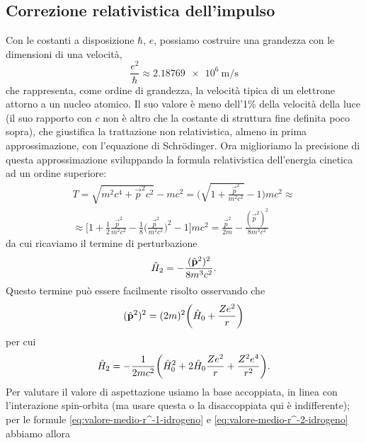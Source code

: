\subsection{Correzione relativistica dell'impulso}
Con le costanti a disposizione $\hbar$, $e$, possiamo costruire una grandezza con le dimensioni di una velocità,
\begin{equation}
    \frac{e^2}{\hbar}\approx\SI{2.18769e6}{\meter\per\second}
    \label{eq:velocita-tipica-elettrone}
\end{equation}
che rappresenta, come ordine di grandezza, la velocità tipica di un elettrone attorno a un nucleo atomico.
Il suo valore è meno dell'1\% della velocità della luce (il suo rapporto con $c$ non è altro che la costante di struttura fine definita poco sopra), che giustifica la trattazione non relativistica, almeno in prima approssimazione, con l'equazione di Schrödinger.
Ora miglioriamo la precisione di questa approssimazione sviluppando la formula relativistica dell'energia cinetica ad un ordine superiore:
\begin{multline}
    T=
    \sqrt{m^2c^4+\vec{p}^2c^2}-mc^2=
    \biggl(\sqrt{1+\frac{\vec{p}^2}{m^2c^2}}-1\biggr)mc^2\approx\\\approx
    \biggl[1+\frac12\frac{\vec{p}^2}{m^2c^2}-\frac18\biggl(\frac{\vec{p}^2}{m^2c^2}\biggr)^2-1\biggr]mc^2=
    \frac{\vec{p}^2}{2m}-\frac{(\vec{p}^2)^2}{8m^3c^2}
    \label{eq:energia-cinetica-relativistica}
\end{multline}
da cui ricaviamo il termine di perturbazione
\begin{equation}
    \hat{H}_2=-\frac{(\hat{\mathbf{p}}^2)^2}{8m^3c^2}.
    \label{eq:perturbazione-energia-cinetica-relativistica}
\end{equation}
Questo termine può essere facilmente risolto osservando che
\begin{equation}
    (\hat{\mathbf{p}}^2)^2=(2m)^2\biggl(\hat{H}_0+\frac{Ze^2}{r}\biggr)
\end{equation}
per cui
\begin{equation}
    \hat{H}_2=-\frac1{2mc^2}\biggl(\hat{H}_0^2+2\hat{H}_0\frac{Ze^2}{r}+\frac{Z^2e^4}{r^2}\biggr).
\end{equation}
Per valutare il valore di aspettazione usiamo la base accoppiata, in linea con l'interazione spin-orbita (ma usare questa o la disaccoppiata qui è indifferente); per le formule \eqref{eq:valore-medio-r^-1-idrogeno} e \eqref{eq:valore-medio-r^-2-idrogeno} abbiamo allora
